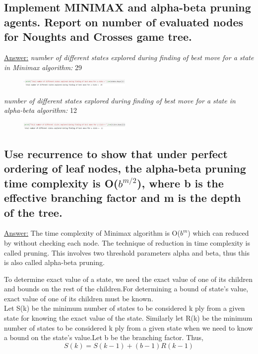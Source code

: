 \documentclass[15pt,journal]{IEEEtran}
\begin{document}
\subsection{Implement MINIMAX and alpha-beta pruning agents. Report on number of evaluated nodes for Noughts and Crosses game tree.}
\underline{Answer:} 
\emph{number of different states explored during finding of best move for a state in Minimax algorithm:} 29
\begin{figure}[H]%
\begin {center}
\includegraphics[width=0.48\textwidth]{images/Minimax outp.png}
\caption{} %
\label{fig:ecg}
\end {center}
\end{figure}
\emph{number of different states explored during finding of best move for a state in alpha-beta algorithm:} 12
\begin{figure}[H]%
\begin {center}
\includegraphics[width=0.48\textwidth]{images/alpha.png}
\caption{} %
\label{fig:ecg}
\end {center}
\end{figure}

\subsection{Use recurrence to show that under perfect ordering of leaf nodes, the alpha-beta pruning time complexity is O($b^{m/2}$), where b is the effective branching factor and m is the depth of the tree.}
\underline{Answer:} 
The time complexity of Minimax algorithm is O($b^{m}$) which can reduced by without checking each node. The technique of reduction in time complexity is called pruning. This involves two threshold parameters alpha and beta, thus this is also called alpha-beta pruning.

To determine exact value of a state, we need the exact value of one of its children and bounds on the rest of the children.For determining a bound of state's value, exact value of one of its children must be known.\\
Let S(k) be the minimum number of states to be considered k ply from a given state for knowing the exact value of the state. Similarly let R(k) be the minimum number of states to be considered k ply from a given state when we need to know a bound on the state's value.Let b be the branching factor. Thus,
\begin{equation}
   S(k) = S(k-1)+(b-1)R(k-1)
   \label{equation:  } 
\end{equation}
\end{document}
